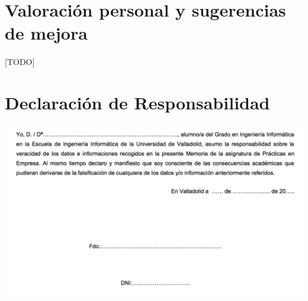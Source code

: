 \documentclass[11pt,a4paper,spanish]{article}
\begin{document}
  \section{Valoración personal y sugerencias de mejora}

    \paragraph{}
    [TODO]

  \newpage
   \section{Declaración de Responsabilidad}

       \includegraphics[width=\textwidth]{responsibility-declaration}
\end{document}
